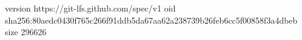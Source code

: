 version https://git-lfs.github.com/spec/v1
oid sha256:80aedc0430f765c266f91ddb5da67aa62a238739b26feb6cc5f00858f3a4dbeb
size 296626
